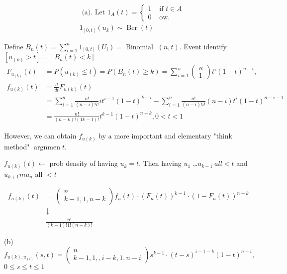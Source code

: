 \documentclass[10pt]{article}
\begin{document}
$$
\begin{aligned}
& \text { (a). Let } 1_{A}(t)= \begin{cases}1 & \text { if } t \in A \\
0 & \text { ow. }\end{cases} \\
& 1_{\left[0,t\right]}\left(u_{k}\right) \sim \operatorname{Ber}(t)
\end{aligned}
$$

Define $B_{n}(t)=\sum_{i=1}^{n} 1_{[0, t]}\left(U_{i}\right)=\operatorname{Binomial}$ $(n, t)$.
Event identify $\left[u_{(k)}>t\right]=\left[B_{n}(t)<k\right]$
$$
\begin{aligned}
F_{u_{(k)}}(t) & =P\left(u_{(k)} \leq t\right)=P\left(B_{n}(t) \geqslant k\right)=\sum_{i=1}^{n}\left(\begin{array}{l}
n \\
1
\end{array}\right) t^{i}(1-t)^{n-i}, \\
f_{u(k)}(t) & =\frac{d}{d t} F_{u(k)}(t) \\
& =\sum_{i=1}^{n} \frac{n !}{(n-i) ! i !} i t^{i-1}(1-t)^{k-i}-\sum_{i=1}^{n} \frac{n !}{(n-i) !i!}(n-i) t^{i}(1-t)^{n-i-1} \\
& =\frac{n !}{(n-k) !(1k-1) !} t^{k-1}(1-t)^{n-k}, 0<t<1
\end{aligned}
$$

However, we can obtain $f_{u(k)}$ by a more important and elementary "think method"
$\operatorname{argnmen} t$.

$f_{u(k)}(t) \leftarrow$ prob density of having $u_{k}=t$. Then having $u_{1}$ \dots  $u_{k-1} \ all <t$ and $u_{k+1} m u_{n}$ all $<t$

$$
\begin{aligned}
f_{n(k)}(t) & =\left(\begin{array}{c}
n \\
k-1,1, n-k
\end{array}\right) f_{u}(t) \cdot\left(F_{n}(t)\right)^{k-1} \cdot\left(1-F_{n}(t)\right)^{n-k} . \\
& \downarrow \\
& \frac{n !}{(k-1) ! 1 !(n-k) !}
\end{aligned}
$$

(b) $f_{u(k), u_{(i)}}(s, t)=\left(\begin{array}{c}
  n \\
  k-1,1,,i-k,1, n-i
  \end{array}\right) s^{k-1} \cdot(t-s)^{i-1-k}(1-t)^{n-i}$,
$
0 \leq s \leq t \leq 1
$
\end{document}
